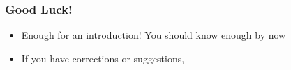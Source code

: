 \begin{frame}
    \frametitle{Good Luck!}
    \begin{itemize}
        \item Enough for an introduction! You should know enough by now
        \item If you have corrections or suggestions,
    \end{itemize}
\end{frame}